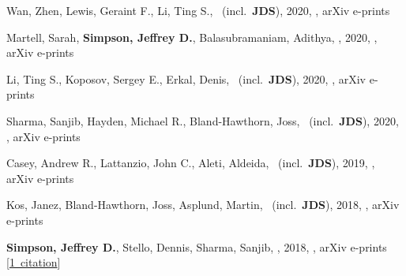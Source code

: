 \item[{\color{numcolor}\scriptsize7}] Wan, Zhen, Lewis, Geraint F., Li, Ting S., \etal\ (incl.\ \textbf{JDS}), 2020, , arXiv e-prints

\item[{\color{numcolor}\scriptsize6}] Martell, Sarah, \textbf{Simpson, Jeffrey D.}, Balasubramaniam, Adithya, \etal, 2020, , arXiv e-prints

\item[{\color{numcolor}\scriptsize5}] Li, Ting S., Koposov, Sergey E., Erkal, Denis, \etal\ (incl.\ \textbf{JDS}), 2020, , arXiv e-prints

\item[{\color{numcolor}\scriptsize4}] Sharma, Sanjib, Hayden, Michael R., Bland-Hawthorn, Joss, \etal\ (incl.\ \textbf{JDS}), 2020, , arXiv e-prints

\item[{\color{numcolor}\scriptsize3}] Casey, Andrew R., Lattanzio, John C., Aleti, Aldeida, \etal\ (incl.\ \textbf{JDS}), 2019, , arXiv e-prints

\item[{\color{numcolor}\scriptsize2}] Kos, Janez, Bland-Hawthorn, Joss, Asplund, Martin, \etal\ (incl.\ \textbf{JDS}), 2018, , arXiv e-prints

\item[{\color{numcolor}\scriptsize1}] \textbf{Simpson, Jeffrey D.}, Stello, Dennis, Sharma, Sanjib, \etal, 2018, , arXiv e-prints [\href{https://ui.adsabs.harvard.edu/#abs/2018arXiv180405900S}{1~citation}]